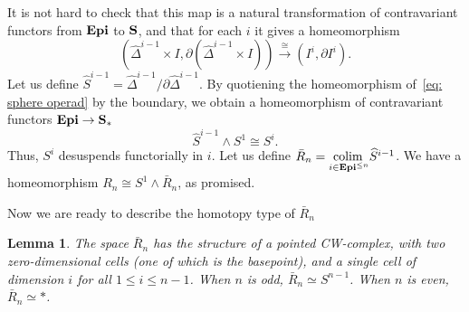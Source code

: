 \documentclass[psamsfonts]{amsart}
\theoremstyle{plain}
\newtheorem{lem}[thm]{Lemma}
\theoremstyle{definition}
\theoremstyle{remark}
\newcommand{\catname}[1]{{\normalfont\textbf{#1}}}
\newcommand{\epi}{\catname{Epi}}
\newcommand{\spaces}{\catname{S}_*}
\newcommand{\unpointed}{\catname{S}}
\DeclareMathOperator{\colim}{colim \,}
\begin{document}
It is not hard to check that this map is a natural transformation of contravariant functors from $\epi$ to $\unpointed$, and that for each $i$ it gives a homeomorphism 
\[
(\widehat\Delta^{i-1} \times I, \partial (\widehat\Delta^{i-1} \times I))\xrightarrow{\cong} (I^i, \partial I^i).
\] 
Let us define $\widehat S^{i-1}=\widehat \Delta^{i-1}/\partial \widehat \Delta^{i-1}$. By quotiening the homeomorphism of~\eqref{eq: sphere operad} by the boundary, we obtain a homeomorphism of contravariant functors $\epi\to \spaces$
\[
\widehat S^{i-1} \wedge S^1\cong S^i.
\]
Thus, $S^i$ desuspends functorially in $i$. Let us define $\bar R_n=\underset{i\in \epi^{\le n}}{\colim}\widehat S^{i-1}$. We have a homeomorphism $R_n \cong S^1\wedge \bar R_n$, as promised.

Now we are ready to describe the homotopy type of $\bar R_n$
\begin{lem}\label{lem:R_n}
The space $\bar R_n$ has the structure of a pointed CW-complex, with two zero-dimensional cells (one of which is the basepoint), and a single cell of dimension $i$ for all $1\le i \le n-1$. When $n$ is odd, $\bar R_n\simeq S^{n-1}$. When $n$ is even, $\bar R_n \simeq *$.   
\end{lem}
\end{document}
